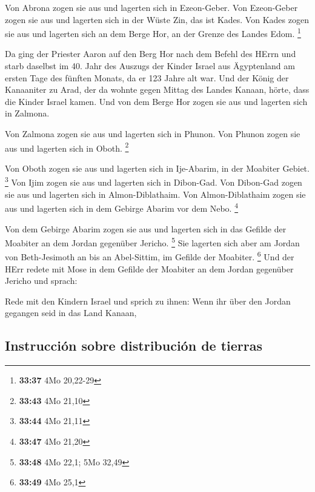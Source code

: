  Von Abrona zogen sie aus und lagerten sich in
Ezeon-Geber.  Von Ezeon-Geber zogen sie aus und lagerten
sich in der Wüste Zin, das ist Kades.  Von Kades zogen
sie aus und lagerten sich an dem Berge Hor, an der Grenze des Landes
Edom. \footnote{\textbf{33:37} 4Mo 20,22-29}

 Da ging der Priester Aaron auf den Berg Hor nach dem
Befehl des HErrn und starb daselbst im 40. Jahr des Auszugs der Kinder
Israel aus Ägyptenland am ersten Tage des fünften Monats,
 da er 123 Jahre alt war.  Und der König
der Kanaaniter zu Arad, der da wohnte gegen Mittag des Landes Kanaan,
hörte, dass die Kinder Israel kamen.  Und von dem Berge
Hor zogen sie aus und lagerten sich in Zalmona.

 Von Zalmona zogen sie aus und lagerten sich in Phunon.
 Von Phunon zogen sie aus und lagerten sich in Oboth.
\footnote{\textbf{33:43} 4Mo 21,10}

 Von Oboth zogen sie aus und lagerten sich in Ije-Abarim,
in der Moabiter Gebiet. \footnote{\textbf{33:44} 4Mo 21,11}
 Von Ijim zogen sie aus und lagerten sich in Dibon-Gad.
 Von Dibon-Gad zogen sie aus und lagerten sich in
Almon-Diblathaim.  Von Almon-Diblathaim zogen sie aus und
lagerten sich in dem Gebirge Abarim vor dem Nebo. \footnote{\textbf{33:47}
  4Mo 21,20}

 Von dem Gebirge Abarim zogen sie aus und lagerten sich
in das Gefilde der Moabiter an dem Jordan gegenüber Jericho. \footnote{\textbf{33:48}
  4Mo 22,1; 5Mo 32,49}  Sie lagerten sich aber am Jordan
von Beth-Jesimoth an bis an Abel-Sittim, im Gefilde der Moabiter.
\footnote{\textbf{33:49} 4Mo 25,1}  Und der HErr redete
mit Mose in dem Gefilde der Moabiter an dem Jordan gegenüber Jericho und
sprach:

 Rede mit den Kindern Israel und sprich zu ihnen: Wenn
ihr über den Jordan gegangen seid in das Land Kanaan,

\hypertarget{instrucciuxf3n-sobre-distribuciuxf3n-de-tierras}{%
\subsection{Instrucción sobre distribución de
tierras}\label{instrucciuxf3n-sobre-distribuciuxf3n-de-tierras}}


